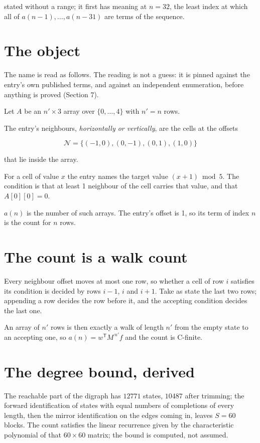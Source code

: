 \documentclass[11pt]{article}
\theoremstyle{definition}
\begin{document}
stated without a range; it first has meaning at $n = 32$, the least index at which all of $a(n-1),\dots,a(n-31)$ are terms of the sequence.

\section{The object}

The name is read as follows. The reading is not a guess: it is pinned against the entry's own published terms, and against an independent enumeration, before anything is proved (Section 7).

Let $A$ be an $n' \times 3$ array over $\{0,\dots,4\}$ with $n' = n$ rows.

The entry's neighbours, {\itshape horizontally or vertically}, are the cells at the offsets

\[\mathcal{N} = \{(-1,0), (0,-1), (0,1), (1,0)\}\]

that lie inside the array.

For a cell of value $x$ the entry names the target value $(x + 1) \bmod 5$. The condition is that at least 1 neighbour of the cell carries that value, and that $A[0][0] = 0$.

$a(n)$ is the number of such arrays. The entry's offset is 1, so its term of index $n$ is the count for $n$ rows.

\section{The count is a walk count}

Every neighbour offset moves at most one row, so whether a cell of row $i$ satisfies its condition is decided by rows $i-1$, $i$ and $i+1$. Take as state the last two rows; appending a row decides the row before it, and the accepting condition decides the last one.

An array of $n'$ rows is then exactly a walk of length $n'$ from the empty state to an accepting one, so $a(n) = w^{\mathsf T}M^{\,n'}f$ and the count is C-finite.

\section{The degree bound, derived}

The reachable part of the digraph has $12771$ states, $10487$ after trimming; the forward identification of states with equal numbers of completions of every length, then the mirror identification on the edges coming in, leaves $S = 60$ blocks. The count satisfies the linear recurrence given by the characteristic polynomial of that $60\times60$ matrix; the bound is computed, not assumed.
\end{document}
